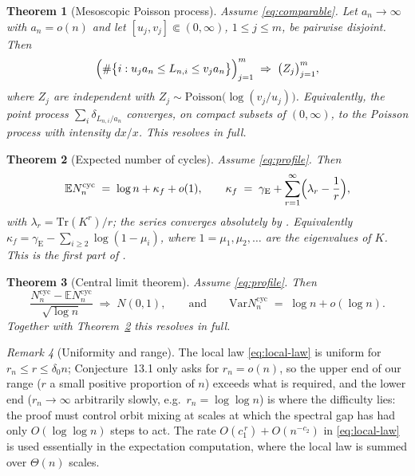 \documentclass[11pt]{article}
\newcommand{\E}{\mathbb{E}}
\newcommand{\1}{\mathbf{1}}
\newcommand{\Var}{\mathrm{Var}}
\newcommand{\Tr}{\mathrm{Tr}}
\newcommand{\cyc}{\mathrm{cyc}}
\newcommand{\Poisson}{\mathrm{Poisson}}
\newcommand{\gE}{\gamma_{\mathrm{E}}}
\newtheorem{theorem}{Theorem}[section]
\theoremstyle{remark}
\newtheorem{remark}[theorem]{Remark}
\begin{document}
\begin{theorem}[Mesoscopic Poisson process]\label{thm:ppp}
Assume \eqref{eq:comparable}. Let $a_n\to\infty$ with $a_n=o(n)$ and
let $[u_j,v_j]\Subset(0,\infty)$, $1\le j\le m$, be pairwise disjoint.
Then
\begin{equation}\label{eq:ppp-vector}
\Bigl(\#\bigl\{i:u_ja_n\le L_{n,i}\le v_ja_n\bigr\}\Bigr)_{j=1}^m
\;\Rightarrow\;\bigl(Z_j\bigr)_{j=1}^m,
\end{equation}
where $Z_j$ are independent with
$Z_j\sim\Poisson\bigl(\log(v_j/u_j)\bigr)$. Equivalently, the point
process $\sum_{i}\delta_{L_{n,i}/a_n}$ converges, on compact subsets
of $(0,\infty)$, to the Poisson process with intensity $dx/x$. This
resolves \cite[Conjecture~13.1]{Lon26} in full.
\end{theorem}

\begin{theorem}[Expected number of cycles]\label{thm:expectation}
Assume \eqref{eq:profile}. Then
\[
\E N_n^{\cyc}\;=\;\log n+\kappa_f+o(1),
\qquad
\kappa_f\;=\;\gE+\sum_{r=1}^\infty\Bigl(\lambda_r-\frac1r\Bigr),
\]
with $\lambda_r=\Tr(K^r)/r$; the series converges absolutely by
\cite[Theorem~5.19]{Lon26}. Equivalently
$\kappa_f=\gE-\sum_{i\ge2}\log(1-\mu_i)$, where $1=\mu_1,\mu_2,\dots$
are the eigenvalues of $K$. This is the first part of
\cite[Conjecture~13.2]{Lon26}.
\end{theorem}

\begin{theorem}[Central limit theorem]\label{thm:clt}
Assume \eqref{eq:profile}. Then
\[
\frac{N_n^{\cyc}-\E N_n^{\cyc}}{\sqrt{\log n}}\;\Rightarrow\;N(0,1),
\qquad\text{and}\qquad
\Var N_n^{\cyc}\;=\;\log n+o(\log n).
\]
Together with Theorem~\ref{thm:expectation} this resolves
\cite[Conjecture~13.2]{Lon26} in full.
\end{theorem}

\begin{remark}[Uniformity and range]\label{rem:uniform}
The local law \eqref{eq:local-law} is uniform for
$r_n\le r\le\delta_0 n$; Conjecture~13.1 only asks for $r_n=o(n)$, so
the upper end of our range ($r$ a small positive proportion of $n$)
exceeds what is required, and the lower end ($r_n\to\infty$
arbitrarily slowly, e.g.\ $r_n=\log\log n$) is where the difficulty
lies: the proof must control orbit mixing at scales at which the
spectral gap has had only $O(\log\log n)$ steps to act. The rate
$O(c_1^{\,r})+O(n^{-c_2})$ in \eqref{eq:local-law} is used essentially
in the expectation computation, where the local law is summed over
$\Theta(n)$ scales.
\end{remark}
\end{document}
